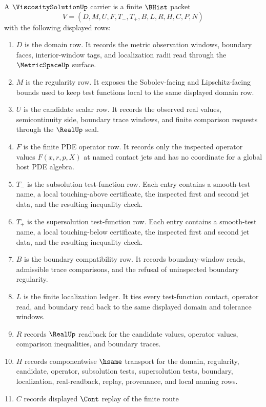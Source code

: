 \begin{definition}
\label{def:viscosity-solution-carrier}
A $\ViscositySolutionUp$ carrier is a finite $\BHist$ packet
$$
V=(D,M,U,F,T_{-},T_{+},B,L,R,H,C,P,N)
$$
with the following displayed rows:
\begin{enumerate}
\item $D$ is the domain row. It records the metric observation windows, boundary faces, interior-window tags, and localization radii read through the $\MetricSpaceUp$ surface.
\item $M$ is the regularity row. It exposes the Sobolev-facing and Lipschitz-facing bounds used to keep test functions local to the same displayed domain row.
\item $U$ is the candidate scalar row. It records the observed real values, semicontinuity side, boundary trace windows, and finite comparison requests through the $\RealUp$ seal.
\item $F$ is the finite PDE operator row. It records only the inspected operator values $F(x,r,p,X)$ at named contact jets and has no coordinate for a global host PDE algebra.
\item $T_{-}$ is the subsolution test-function row. Each entry contains a smooth-test name, a local touching-above certificate, the inspected first and second jet data, and the resulting inequality check.
\item $T_{+}$ is the supersolution test-function row. Each entry contains a smooth-test name, a local touching-below certificate, the inspected first and second jet data, and the resulting inequality check.
\item $B$ is the boundary compatibility row. It records boundary-window reads, admissible trace comparisons, and the refusal of uninspected boundary regularity.
\item $L$ is the finite localization ledger. It ties every test-function contact, operator read, and boundary read back to the same displayed domain and tolerance windows.
\item $R$ records $\RealUp$ readback for the candidate values, operator values, comparison inequalities, and boundary traces.
\item $H$ records componentwise $\hsame$ transport for the domain, regularity, candidate, operator, subsolution tests, supersolution tests, boundary, localization, real-readback, replay, provenance, and local naming rows.
\item $C$ records displayed $\Cont$ replay of the finite route

\end{enumerate}
\end{definition}
